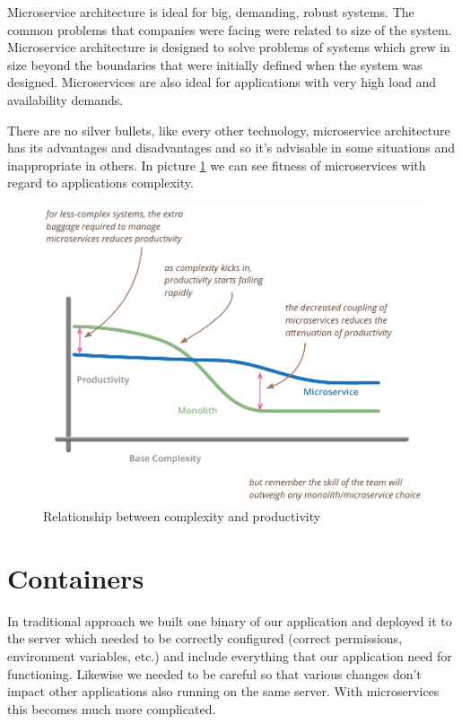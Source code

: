\documentclass[12pt,oneside]{fithesis2}
\begin{document}
Microservice architecture is ideal for big, demanding, robust systems. The common problems that companies were facing were related to size of the system. Microservice architecture is designed to solve problems of systems which grew in size beyond the boundaries that were initially defined when the system was designed. Microservices are also ideal for applications with very high load and availability demands.

There are no silver bullets, like every other technology, microservice architecture has its advantages and disadvantages and so it's advisable in some situations and inappropriate in others. In picture \ref{productivity} we can see fitness of microservices with regard to applications complexity.

\begin{figure}[ht!]
	\label{productivity}
	\centering
	\includegraphics[width=\textwidth]{images/complexity_productivity.png}
	\caption{Relationship between complexity and productivity\footnotemark}
\end{figure}


\section{Containers}

In traditional approach we built one binary of our application and deployed it to the server which needed to be correctly configured (correct permissions, environment variables, etc.) and include everything that our application need for functioning. Likewise we needed to be careful so that various changes don't impact other applications also running on the same server. With microservices this becomes much more complicated.
\end{document}
